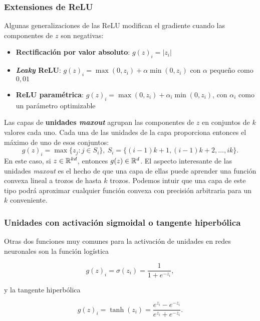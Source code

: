 \subsubsection{Extensiones de ReLU}\label{extensiones-de-relu}

Algunas generalizaciones de las ReLU modifican el gradiente cuando las
componentes de \(z\) son negativas:

\begin{itemize}
\tightlist
\item
  \textbf{Rectificación por valor absoluto}:
  \(g(z)_{i}=\lvert z_{i} \rvert\)
\item
  \textbf{\emph{Leaky} ReLU}: \(g(z)_i=\max(0,z_i)+\alpha\min(0,z_i)\)
  con \(\alpha\) pequeño como \(0,01\)
\item
  \textbf{ReLU paramétrica}: \(g(z)_i=\max(0,z_i)+\alpha_i\min(0,z_i)\),
  con \(\alpha_i\) como un parámetro optimizable
\end{itemize}

Las capas de \textbf{unidades \emph{maxout}} agrupan las componentes de
\(z\) en conjuntos de \(k\) valores cada uno. Cada una de las unidades
de la capa proporciona entonces el máximo de uno de esos conjuntos:
\[g(z)_i=\max\{z_j:j\in S_i\},\ S_i=\{(i-1)k + 1, (i-1)k + 2,\dots, ik\}.\]
En este caso, si \(z\in\mathbb{R}^{kd}\), entonces \(g(z)\in\mathbb{R}^{d}\). El
aspecto interesante de las unidades \emph{maxout} es el hecho de que una
capa de ellas puede aprender una función convexa lineal a trozos de
hasta \(k\) trozos. Podemos intuir que una capa de este tipo podrá
aproximar cualquier función convexa con precisión arbitraria para un
\(k\) conveniente.

\subsubsection{Unidades con activación sigmoidal o tangente
hiperbólica}\label{unidades-con-activaciuxf3n-sigmoidal-o-tangente-hiperbuxf3lica}

Otras dos funciones muy comunes para la activación de unidades en redes
neuronales son la función logística

\begin{equation}
  g(z)_i=\sigma(z_i)=\frac{1}{1+e^{-z_i}},
\end{equation}

y la tangente hiperbólica

\begin{equation}
  g(z)_i=\tanh(z_i)=\frac{e^{z_i}-e^{-z_i}}{e^{z_i}+e^{-z_i}}.
\end{equation}

